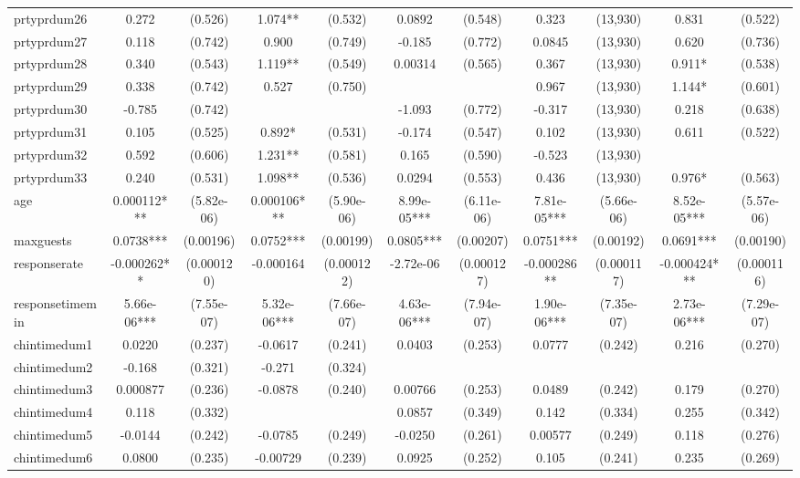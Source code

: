 \documentclass[]{article}
\begin{document}
\begin{tabular}{lcccccccccc}
prtyprdum26 & 0.272 & (0.526) & 1.074** & (0.532) & 0.0892 & (0.548) & 0.323 & (13,930) & 0.831 & (0.522) \\
prtyprdum27 & 0.118 & (0.742) & 0.900 & (0.749) & -0.185 & (0.772) & 0.0845 & (13,930) & 0.620 & (0.736) \\
prtyprdum28 & 0.340 & (0.543) & 1.119** & (0.549) & 0.00314 & (0.565) & 0.367 & (13,930) & 0.911* & (0.538) \\
prtyprdum29 & 0.338 & (0.742) & 0.527 & (0.750) &  &  & 0.967 & (13,930) & 1.144* & (0.601) \\
prtyprdum30 & -0.785 & (0.742) &  &  & -1.093 & (0.772) & -0.317 & (13,930) & 0.218 & (0.638) \\
prtyprdum31 & 0.105 & (0.525) & 0.892* & (0.531) & -0.174 & (0.547) & 0.102 & (13,930) & 0.611 & (0.522) \\
prtyprdum32 & 0.592 & (0.606) & 1.231** & (0.581) & 0.165 & (0.590) & -0.523 & (13,930) &  &  \\
prtyprdum33 & 0.240 & (0.531) & 1.098** & (0.536) & 0.0294 & (0.553) & 0.436 & (13,930) & 0.976* & (0.563) \\
age & 0.000112*** & (5.82e-06) & 0.000106*** & (5.90e-06) & 8.99e-05*** & (6.11e-06) & 7.81e-05*** & (5.66e-06) & 8.52e-05*** & (5.57e-06) \\
maxguests & 0.0738*** & (0.00196) & 0.0752*** & (0.00199) & 0.0805*** & (0.00207) & 0.0751*** & (0.00192) & 0.0691*** & (0.00190) \\
responserate & -0.000262** & (0.000120) & -0.000164 & (0.000122) & -2.72e-06 & (0.000127) & -0.000286** & (0.000117) & -0.000424*** & (0.000116) \\
responsetimemin & 5.66e-06*** & (7.55e-07) & 5.32e-06*** & (7.66e-07) & 4.63e-06*** & (7.94e-07) & 1.90e-06*** & (7.35e-07) & 2.73e-06*** & (7.29e-07) \\
chintimedum1 & 0.0220 & (0.237) & -0.0617 & (0.241) & 0.0403 & (0.253) & 0.0777 & (0.242) & 0.216 & (0.270) \\
chintimedum2 & -0.168 & (0.321) & -0.271 & (0.324) &  &  &  &  &  &  \\
chintimedum3 & 0.000877 & (0.236) & -0.0878 & (0.240) & 0.00766 & (0.253) & 0.0489 & (0.242) & 0.179 & (0.270) \\
chintimedum4 & 0.118 & (0.332) &  &  & 0.0857 & (0.349) & 0.142 & (0.334) & 0.255 & (0.342) \\
chintimedum5 & -0.0144 & (0.242) & -0.0785 & (0.249) & -0.0250 & (0.261) & 0.00577 & (0.249) & 0.118 & (0.276) \\
chintimedum6 & 0.0800 & (0.235) & -0.00729 & (0.239) & 0.0925 & (0.252) & 0.105 & (0.241) & 0.235 & (0.269) \\

\end{tabular}
\end{document}
